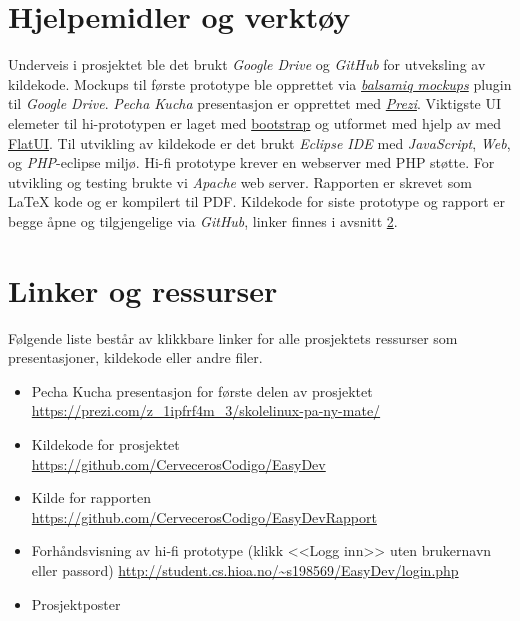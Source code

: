 \section{Hjelpemidler og verktøy} \label{sec:hjelpogverkt}
Underveis i prosjektet ble det brukt \textit{Google Drive} og \textit{GitHub} for utveksling av kildekode. Mockups til første prototype ble opprettet via \href{https://balsamiq.com/}{\textit{balsamiq mockups}} plugin til \textit{Google Drive}. \textit{Pecha Kucha} presentasjon er opprettet med \href{https://prezi.com/z_1ipfrf4m_3/skolelinux-pa-ny-mate/}{\textit{Prezi}}. Viktigste UI elemeter til hi-prototypen er laget med \href{http://getbootstrap.com/}{bootstrap} og utformet med hjelp av med \href{http://designmodo.github.io/Flat-UI/}{FlatUI}. Til utvikling av kildekode er det brukt \textit{Eclipse IDE} med \textit{JavaScript}, \textit{Web}, og \textit{PHP}-eclipse miljø. Hi-fi prototype krever en webserver med PHP støtte. For utvikling og testing brukte vi \textit{Apache} web server.
Rapporten er skrevet som \LaTeX{} kode og er kompilert til PDF.
Kildekode for siste prototype og rapport er begge åpne og tilgjengelige via \textit{GitHub}, linker finnes i avsnitt \ref{sec:linker}.

\section{Linker og ressurser} \label{sec:linker}
Følgende liste består av klikkbare linker for alle prosjektets ressurser som presentasjoner, kildekode eller andre filer. 
\begin{itemize}
\item Pecha Kucha presentasjon for første delen av prosjektet\\ \url{https://prezi.com/z_1ipfrf4m_3/skolelinux-pa-ny-mate/}
\item Kildekode for prosjektet\\
\url{https://github.com/CervecerosCodigo/EasyDev}
\item Kilde for rapporten\\
\url{https://github.com/CervecerosCodigo/EasyDevRapport}
\item Forhåndsvisning av hi-fi prototype (klikk <<Logg inn>> uten brukernavn eller passord)
\url{http://student.cs.hioa.no/~s198569/EasyDev/login.php}
\item Prosjektposter
\end{itemize}